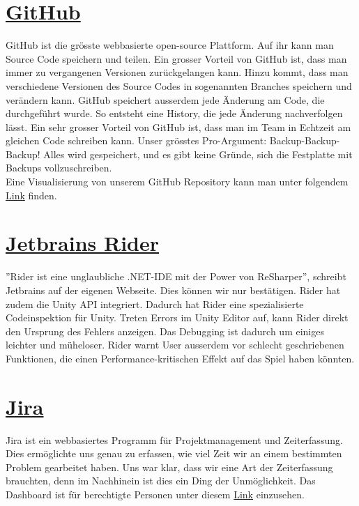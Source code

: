 \section{\href{https://github.com/}{GitHub}}
GitHub ist die grösste webbasierte open-source Plattform. Auf ihr kann man Source Code speichern und teilen. Ein grosser Vorteil von GitHub ist, dass man immer zu vergangenen Versionen zurückgelangen kann.
Hinzu kommt, dass man verschiedene Versionen des Source Codes in sogenannten Branches speichern und verändern kann. GitHub speichert ausserdem jede Änderung am Code, die durchgeführt wurde. So entsteht eine History, die jede Änderung nachverfolgen lässt. 
Ein sehr grosser Vorteil von GitHub ist, dass man im Team in Echtzeit am gleichen Code schreiben kann. Unser grösstes Pro-Argument: Backup-Backup-Backup!
Alles wird gespeichert, und es gibt keine Gründe, sich die Festplatte mit Backups vollzuschreiben. \\
Eine Visualisierung von unserem \gls{GitHub Repository} kann man unter folgendem \href{https://www.youtube.com/watch?v=IQT37uwpcg4}{Link} finden.


\section{\href{https://www.jetbrains.com/rider/}{Jetbrains Rider}}
''Rider ist eine unglaubliche .NET-IDE mit der Power von ReSharper'', schreibt Jetbrains auf der eigenen Webseite. Dies können wir nur bestätigen. Rider hat zudem die Unity API integriert. Dadurch hat Rider eine
spezialisierte Codeinspektion für Unity. Treten Errors im Unity Editor auf, kann Rider direkt den Ursprung des Fehlers anzeigen. Das Debugging ist dadurch um einiges leichter und müheloser. 
Rider warnt User ausserdem vor schlecht geschriebenen Funktionen, die einen Performance-kritischen Effekt auf das Spiel haben könnten. 


\section{\href{https://www.atlassian.com/software/jira}{Jira}}
Jira ist ein webbasiertes Programm für Projektmanagement und Zeiterfassung. Dies ermöglichte uns genau zu erfassen, wie viel Zeit wir an einem bestimmten Problem gearbeitet haben. Uns war klar, dass wir eine Art 
der Zeiterfassung brauchten, denn im Nachhinein ist dies ein Ding der Unmöglichkeit. Das Dashboard ist für berechtigte Personen unter diesem \href{https://maturarbeit--eli-marc.atlassian.net/}{Link} einzusehen.


